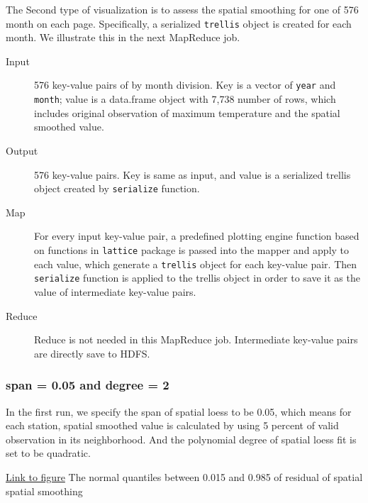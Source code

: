 The Second type of visualization is to assess the spatial smoothing for one of 
576 month on each page. Specifically, a serialized \texttt{trellis} object is 
created for each month. We illustrate this in the next MapReduce job.

\begin{description}
  \item[Input] 576 key-value pairs of by month division. Key is a vector of
  \texttt{year} and \texttt{month}; value is a data.frame object with 7,738 
  number of rows, which includes original observation of maximum temperature
  and the spatial smoothed value. 
  \item[Output] 576 key-value pairs. Key is same as input, and value is a 
  serialized trellis object created by \texttt{serialize} function.
  \item[Map]For every input key-value pair, a predefined plotting engine function
  based on functions in \texttt{lattice} package is passed into the mapper and 
  apply to each value, which generate a \texttt{trellis} object for each 
  key-value pair. Then \texttt{serialize} function is applied to the trellis 
  object in order to save it as the value of intermediate key-value pairs.
  \item[Reduce] Reduce is not needed in this MapReduce job. Intermediate key-value
  pairs are directly save to HDFS.
\end{description}

\subsubsection{span = 0.05 and degree = 2}

In the first run, we specify the span of spatial loess to be 0.05, which means
for each station, spatial smoothed value is calculated by using 5 percent of 
valid observation in its neighborhood. And the polynomial degree of spatial loess 
fit is set to be quadratic.

\begin{framed}
\begin{center}
  \href{../plots/a1950/spaimpute/nonelev/span0.05/a1950.spaResidcenter.bytime.pdf}
  {Link to figure}
  {The normal quantiles between 0.015 and 0.985 of residual of spatial spatial 
  smoothing}
  \label{nonelev.0.05.Residcenter.bytime}
\end{center}
\end{framed}

